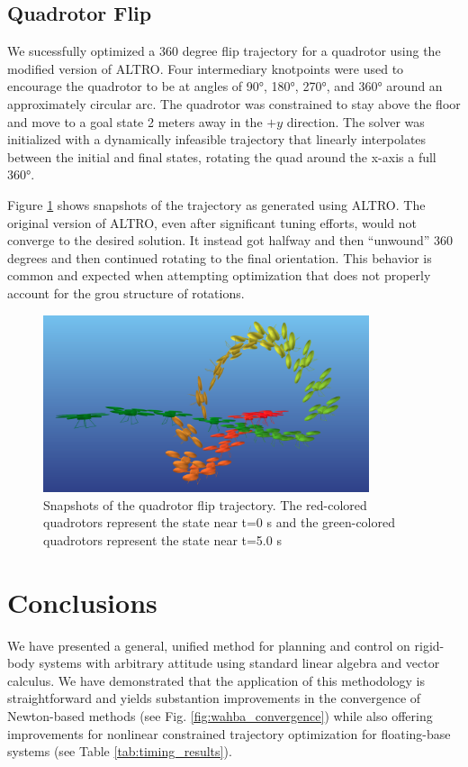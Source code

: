 \documentclass[letterpaper, 10 pt, conference]{ieeeconf}  %
\begin{document}
    \subsection{Quadrotor Flip}
        We sucessfully optimized a 360 degree flip trajectory for a quadrotor using the 
        modified version of ALTRO.
	    Four intermediary knotpoints were used to encourage the quadrotor to be at angles
        of \ang{90}, \ang{180}, \ang{270}, and \ang{360} around an approximately circular arc.
        The quadrotor was constrained
	    to stay above the floor and move to a goal state 2 meters away in the $+y$
	    direction. The solver was initialized with a dynamically infeasible trajectory
	    that linearly interpolates between the initial and final states, rotating the
        quad around the x-axis a full \ang{360}.

	    Figure \ref{fig:quad_flip} shows snapshots of the trajectory as generated using
        ALTRO. The original version of ALTRO, even after significant tuning efforts,
        would not converge to the desired solution. It instead got halfway and then ``unwound''
        360 degrees and then continued rotating to the final orientation. This behavior
        is common and expected when attempting optimization that does not properly account 
        for the grou structure of rotations.

            \begin{figure}[t]
                \centering
                \includegraphics[height=5.2cm,trim={0 0cm 0 0},clip]{figures/quadflip.png}
                \caption{Snapshots of the quadrotor flip trajectory. The
                    red-colored quadrotors represent the state near t=0 s and the
                    green-colored quadrotors represent the state near t=5.0 s
                }
                \label{fig:quad_flip}
            \end{figure}    
    

\section{Conclusions} \label{sec:conclusion}
    We have presented a general, unified method for planning and control on rigid-body
    systems with arbitrary attitude using standard linear algebra and vector calculus.
    We have demonstrated that the application of this methodology is straightforward and
    yields substantion improvements in the convergence of Newton-based methods (see Fig. 
    \ref{fig:wahba_convergence}) while also offering improvements for nonlinear constrained
    trajectory optimization for floating-base systems (see Table \ref{tab:timing_results}).
    
\end{document}
